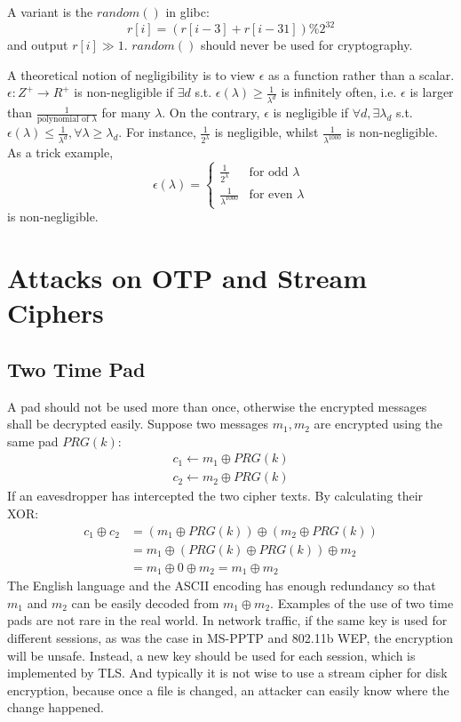 A variant is the $random()$ in glibc:
\begin{equation*}
r[i]=(r[i-3]+r[i-31])\%2^{32}
\end{equation*}
and output $r[i]\gg 1$. $random()$ should never be used for cryptography.

A theoretical notion of negligibility is to view $\epsilon$ as a function rather than a scalar. $\epsilon:Z^+\rightarrow R^+$ is non-negligible if $\exists d$ s.t. $\epsilon(\lambda)\geq\frac{1}{\lambda^d}$ is infinitely often, i.e. $\epsilon$ is larger than $\frac{1}{\text{polynomial of }\lambda}$ for many $\lambda$. On the contrary, $\epsilon$ is negligible if $\forall d,\exists \lambda_d$ s.t. $\epsilon(\lambda)\leq\frac{1}{\lambda^d},\forall\lambda\geq\lambda_d.$ For instance, $\frac{1}{2^\lambda}$ is negligible, whilst $\frac{1}{\lambda^{1000}}$ is non-negligible. As a trick example, 
\[\epsilon(\lambda)=\begin{cases}
\frac{1}{2^\lambda}&\text{for odd }\lambda\\
\frac{1}{\lambda^{1000}}&\text{for even }\lambda
\end{cases}\]
is non-negligible.
\section{Attacks on OTP and Stream Ciphers}
\subsection{Two Time Pad}
A pad should not be used more than once, otherwise the encrypted messages shall be decrypted easily. Suppose two messages $m_1,m_2$ are encrypted using the same pad $PRG(k)$:
\begin{align*}
c_1\leftarrow m_1\oplus PRG(k)\\
c_2\leftarrow m_2\oplus PRG(k)
\end{align*}
If an eavesdropper has intercepted the two cipher texts. By calculating their XOR:
\begin{align*}
c_1\oplus c_2&=(m_1\oplus PRG(k))\oplus(m_2\oplus PRG(k))\\
&=m_1\oplus(PRG(k)\oplus PRG(k))\oplus m_2\\
&=m_1\oplus 0\oplus m_2=m_1\oplus m_2
\end{align*}
The English language and the ASCII encoding has enough redundancy so that $m_1$ and $m_2$ can be easily decoded from $m_1\oplus m_2$. Examples of the use of two time pads are not rare in the real world. In network traffic, if the same key is used for different sessions, as was the case in MS-PPTP and 802.11b WEP, the encryption will be unsafe. Instead, a new key should be used for each session, which is implemented by TLS. And typically it is not wise to use a stream cipher for disk encryption, because once a file is changed, an attacker can easily know where the change happened. 
